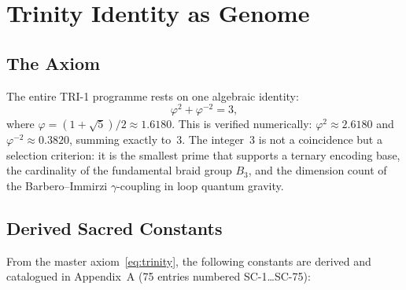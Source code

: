 
\section{Trinity Identity as Genome}
\label{sec:flos74-genome}

\subsection{The Axiom}

The entire TRI-1 programme rests on one algebraic identity:
\begin{equation}\label{eq:trinity}
  \varphi^2 + \varphi^{-2} = 3,
\end{equation}
where \(\varphi = (1+\sqrt{5})/2 \approx 1.6180\).
This is verified numerically: \(\varphi^2 \approx 2.6180\) and
\(\varphi^{-2} \approx 0.3820\), summing exactly to~3.
The integer~3 is not a coincidence but a selection criterion: it is the
smallest prime that supports a ternary encoding base, the cardinality of the
fundamental braid group \(B_3\), and the dimension count of the
Barbero--Immirzi \(\gamma\)-coupling in loop quantum gravity.

\subsection{Derived Sacred Constants}

From the master axiom~\eqref{eq:trinity}, the following constants are derived
and catalogued in Appendix~A (75 entries numbered SC-1\ldots SC-75):

